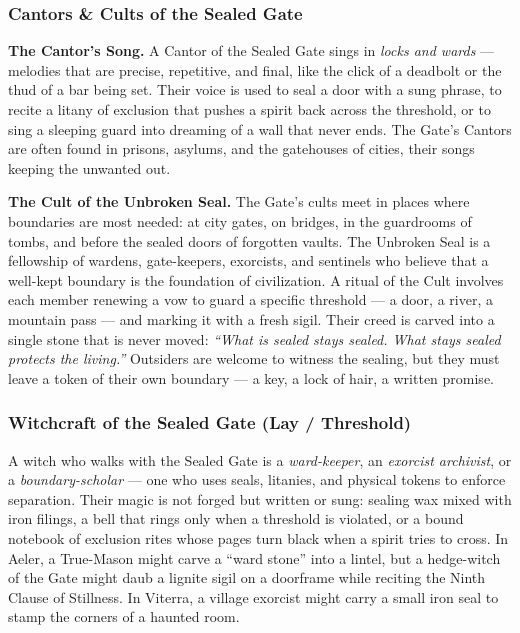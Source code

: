 \subsubsection*{Cantors \& Cults of the Sealed Gate}

\textbf{The Cantor's Song.} A Cantor of the Sealed Gate sings in \textit{locks and wards} --- melodies that are precise, repetitive, and final, like the click of a deadbolt or the thud of a bar being set. Their voice is used to seal a door with a sung phrase, to recite a litany of exclusion that pushes a spirit back across the threshold, or to sing a sleeping guard into dreaming of a wall that never ends. The Gate's Cantors are often found in prisons, asylums, and the gatehouses of cities, their songs keeping the unwanted out.

\textbf{The Cult of the Unbroken Seal.} The Gate's cults meet in places where boundaries are most needed: at city gates, on bridges, in the guardrooms of tombs, and before the sealed doors of forgotten vaults. The Unbroken Seal is a fellowship of wardens, gate-keepers, exorcists, and sentinels who believe that a well-kept boundary is the foundation of civilization. A ritual of the Cult involves each member renewing a vow to guard a specific threshold --- a door, a river, a mountain pass --- and marking it with a fresh sigil. Their creed is carved into a single stone that is never moved: \textit{``What is sealed stays sealed. What stays sealed protects the living.''} Outsiders are welcome to witness the sealing, but they must leave a token of their own boundary --- a key, a lock of hair, a written promise.

\subsubsection*{Witchcraft of the Sealed Gate (Lay / Threshold)}

A witch who walks with the Sealed Gate is a \textit{ward-keeper}, an \textit{exorcist archivist}, or a \textit{boundary-scholar} --- one who uses seals, litanies, and physical tokens to enforce separation. Their magic is not forged but written or sung: sealing wax mixed with iron filings, a bell that rings only when a threshold is violated, or a bound notebook of exclusion rites whose pages turn black when a spirit tries to cross. In Aeler, a True-Mason might carve a ``ward stone'' into a lintel, but a hedge-witch of the Gate might daub a lignite sigil on a doorframe while reciting the Ninth Clause of Stillness. In Viterra, a village exorcist might carry a small iron seal to stamp the corners of a haunted room.


